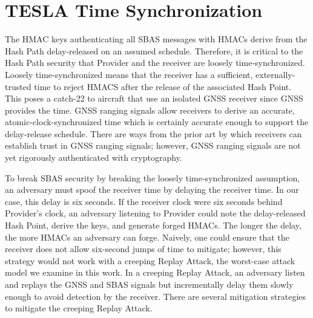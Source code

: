 \documentclass[APA,STIX1COL]{IONjournal/ION-APA Template}
\begin{document}
\section{TESLA Time Synchronization} \label{sec:tesla_time_synchronization}

	The HMAC keys authenticating all SBAS messages with HMACs derive from the Hash Path delay-released on an assumed schedule.
	Therefore, it is critical to the Hash Path security that Provider and the receiver are loosely time-synchronized.
	Loosely time-synchronized means that the receiver has a sufficient, externally-trusted time to reject HMACS after the release of the associated Hash Point.
	This poses a catch-22 to aircraft that use an isolated GNSS receiver since GNSS provides the time.
	GNSS ranging signals allow receivers to derive an accurate, atomic-clock-synchronized time which is certainly accurate enough to support the delay-release schedule.
	There are ways from the prior art by which receivers can establish trust in GNSS ranging signals\cite{Psiaki2016, Fernandez-Hernandez2018}; however, GNSS ranging signals are not yet rigorously authenticated with cryptography.

	To break SBAS security by breaking the loosely time-synchronized assumption, an adversary must spoof the receiver time by delaying the receiver time.
	In our case, this delay is six seconds.
	If the receiver clock were six seconds behind Provider's clock, an adversary listening to Provider could note the delay-released Hash Point, derive the keys, and generate forged HMACs.
	The longer the delay, the more HMACs an adversary can forge.
	Naively, one could ensure that the receiver does not allow six-second jumps of time to mitigate; however, this strategy would not work with a creeping Replay Attack, the worst-case attack model we examine in this work.
	In a creeping Replay Attack, an adversary listen and replays the GNSS and SBAS signals but incrementally delay them slowly enough to avoid detection by the receiver.
	There are several mitigation strategies to mitigate the creeping Replay Attack.
\end{document}
